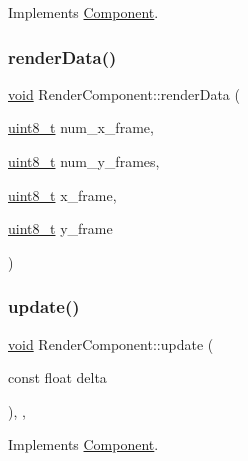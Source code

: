 Implements \hyperlink{classComponent_a2b198f27162a6caf63917e304295f892}{Component}.

\mbox{\label{classRenderComponent_afdeec83350ada025d9e447ac57c86f78}} 
\subsubsection{\texorpdfstring{render\+Data()}{renderData()}}
{\footnotesize\ttfamily \hyperlink{imgui__impl__opengl3__loader_8h_ac668e7cffd9e2e9cfee428b9b2f34fa7}{void} Render\+Component\+::render\+Data (\begin{DoxyParamCaption}\item[{\hyperlink{stdint_8h_aba7bc1797add20fe3efdf37ced1182c5}{uint8\+\_\+t}}]{num\+\_\+x\+\_\+frame,  }\item[{\hyperlink{stdint_8h_aba7bc1797add20fe3efdf37ced1182c5}{uint8\+\_\+t}}]{num\+\_\+y\+\_\+frames,  }\item[{\hyperlink{stdint_8h_aba7bc1797add20fe3efdf37ced1182c5}{uint8\+\_\+t}}]{x\+\_\+frame,  }\item[{\hyperlink{stdint_8h_aba7bc1797add20fe3efdf37ced1182c5}{uint8\+\_\+t}}]{y\+\_\+frame }\end{DoxyParamCaption})}

\mbox{\label{classRenderComponent_a93203c887b05a024f70f30e8a71576bd}} 
\subsubsection{\texorpdfstring{update()}{update()}}
{\footnotesize\ttfamily \hyperlink{imgui__impl__opengl3__loader_8h_ac668e7cffd9e2e9cfee428b9b2f34fa7}{void} Render\+Component\+::update (\begin{DoxyParamCaption}\item[{const float}]{delta }\end{DoxyParamCaption})\hspace{0.3cm}{\ttfamily [inline]}, {\ttfamily [override]}, {\ttfamily [virtual]}}



Implements \hyperlink{classComponent_a3448977e6f464df89e77dda7c6f52204}{Component}.



